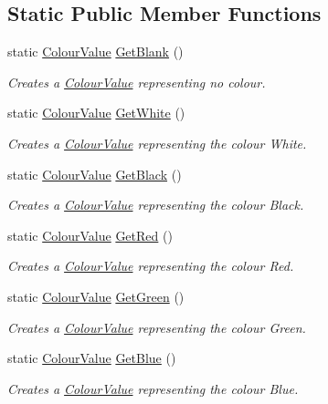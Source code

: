 \subsection*{Static Public Member Functions}
\begin{DoxyCompactItemize}
\item 
static \hyperlink{classphys_1_1ColourValue}{ColourValue} \hyperlink{classphys_1_1ColourValue_a80d899e82d1151487254b5c31a098a44}{GetBlank} ()
\begin{DoxyCompactList}\small\item\em Creates a \hyperlink{classphys_1_1ColourValue}{ColourValue} representing no colour. \item\end{DoxyCompactList}\item 
static \hyperlink{classphys_1_1ColourValue}{ColourValue} \hyperlink{classphys_1_1ColourValue_a77d1204bea0f2f07338d46317d644f6b}{GetWhite} ()
\begin{DoxyCompactList}\small\item\em Creates a \hyperlink{classphys_1_1ColourValue}{ColourValue} representing the colour White. \item\end{DoxyCompactList}\item 
static \hyperlink{classphys_1_1ColourValue}{ColourValue} \hyperlink{classphys_1_1ColourValue_af2f2d5ee05d17baf526d519b239c1f32}{GetBlack} ()
\begin{DoxyCompactList}\small\item\em Creates a \hyperlink{classphys_1_1ColourValue}{ColourValue} representing the colour Black. \item\end{DoxyCompactList}\item 
static \hyperlink{classphys_1_1ColourValue}{ColourValue} \hyperlink{classphys_1_1ColourValue_ada0b48c5bedd42446f9d2dc202c7b226}{GetRed} ()
\begin{DoxyCompactList}\small\item\em Creates a \hyperlink{classphys_1_1ColourValue}{ColourValue} representing the colour Red. \item\end{DoxyCompactList}\item 
static \hyperlink{classphys_1_1ColourValue}{ColourValue} \hyperlink{classphys_1_1ColourValue_abe2c8f2cb0a609af18238fec49630a78}{GetGreen} ()
\begin{DoxyCompactList}\small\item\em Creates a \hyperlink{classphys_1_1ColourValue}{ColourValue} representing the colour Green. \item\end{DoxyCompactList}\item 
static \hyperlink{classphys_1_1ColourValue}{ColourValue} \hyperlink{classphys_1_1ColourValue_a75c9d235524e52c9347085e445a53671}{GetBlue} ()
\begin{DoxyCompactList}\small\item\em Creates a \hyperlink{classphys_1_1ColourValue}{ColourValue} representing the colour Blue. \item\end{DoxyCompactList}\end{DoxyCompactItemize}
